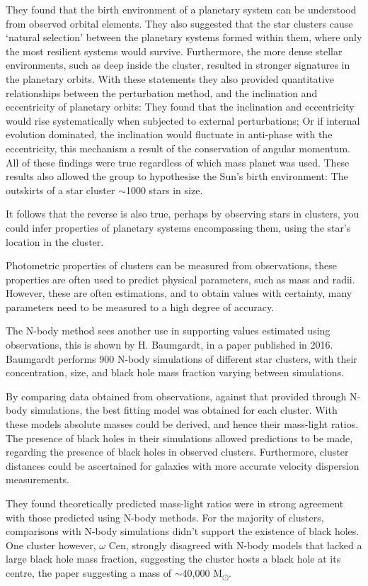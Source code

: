 \documentclass[a4paper,10pt]{article}
\begin{document}
They found that the birth environment of a planetary system can be understood from observed orbital elements. They also suggested that the star clusters cause `natural selection' between the planetary systems formed within them, where only the most resilient systems would survive. Furthermore, the more dense stellar environments, such as deep inside the cluster, resulted in stronger signatures in the planetary orbits. With these statements they also provided quantitative relationships between the perturbation method, and the inclination and eccentricity of planetary orbits: They found that the inclination and eccentricity would rise systematically when subjected to external perturbations; Or if internal evolution dominated, the inclination would fluctuate in anti-phase with the eccentricity, this mechanism a result of the conservation of angular momentum. All of these findings were true regardless of which mass planet was used. These results also allowed the group to hypothesise the Sun's birth environment: The outskirts of a star cluster $\sim$1000 stars in size.

It follows that the reverse is also true, perhaps by observing stars in clusters, you could infer properties of planetary systems encompassing them, using the star's location in the cluster. 

Photometric properties of clusters can be measured from observations, these properties are often used to predict physical parameters, such as mass and radii. However, these are often estimations, and to obtain values with certainty, many parameters need to be measured to a high degree of accuracy.

The N-body method sees another use in supporting values estimated using observations, this is shown by H. Baumgardt, in a paper published in 2016\cite{Baumgardt}. Baumgardt performs 900 N-body simulations of different star clusters, with their concentration, size, and black hole mass fraction varying between simulations. 

By comparing data obtained from observations, against that provided through N-body simulations, the best fitting model was obtained for each cluster. With these models absolute masses could be derived, and hence their mass-light ratios. The presence of black holes in their simulations allowed predictions to be made, regarding the presence of black holes in observed clusters. Furthermore, cluster distances could be ascertained for galaxies with more accurate velocity dispersion measurements.

They found theoretically predicted mass-light ratios were in strong agreement with those predicted using N-body methods. For the majority of clusters, comparisons with N-body simulations didn't support the existence of black holes. One cluster however, $\omega$ Cen, strongly disagreed with N-body models that lacked a large black hole mass fraction, suggesting the cluster hosts a black hole at its centre, the paper suggesting a mass of $\sim$40,000 M\textsubscript{\(\odot\)}.
\end{document}
